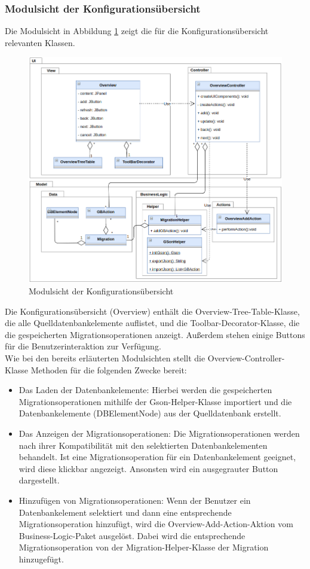 	\subsubsection{Modulsicht der Konfigurationsübersicht}
	Die Modulsicht in  Abbildung \ref{img:modulsicht-overview} zeigt die für die Konfigurationsübersicht relevanten Klassen.
	\begin{figure}[H]
		\centering
		\includegraphics[width=\textwidth]{images/sichten/modulsicht-overview}
		\caption{Modulsicht der Konfigurationsübersicht}
		\label{img:modulsicht-overview}
	\end{figure}
	Die Konfigurationsübersicht (Overview) enthält die Overview-Tree-Table-Klasse, die alle	Quelldatenbankelemente auflistet, und die Toolbar-Decorator-Klasse, die die gespeicherten Migrationsoperationen anzeigt. Außerdem stehen einige Buttons für die Benutzerinteraktion zur Verfügung. \\
	Wie bei den bereits erläuterten Modulsichten stellt die Overview-Controller-Klasse Methoden für die folgenden Zwecke bereit:
	\begin{itemize}
		\item Das Laden der Datenbankelemente: Hierbei werden die gespeicherten Migrationsoperationen mithilfe der Gson-Helper-Klasse importiert und die Datenbankelemente (DBElementNode) aus der Quelldatenbank erstellt.
		\item Das Anzeigen der Migrationsoperationen: Die Migrationsoperationen werden nach ihrer Kompatibilität mit den selektierten Datenbankelementen behandelt. Ist eine Migrationsoperation für ein Datenbankelement geeignet, wird diese klickbar angezeigt. Ansonsten wird ein ausgegrauter Button dargestellt.
		\item Hinzufügen von Migrationsoperationen: Wenn der Benutzer ein Datenbankelement selektiert und dann eine entsprechende Migrationsoperation hinzufügt, wird die Overview-Add-Action-Aktion vom Business-Logic-Paket ausgelöst. Dabei wird die entsprechende Migrationsoperation von der Migration-Helper-Klasse der Migration hinzugefügt.
	\end{itemize}
	
